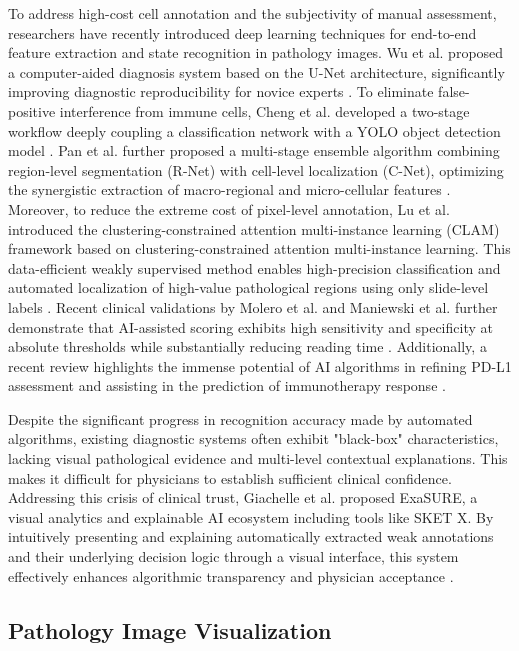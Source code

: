 \documentclass[journal]{vgtc}                     %
\begin{document}
To address high-cost cell annotation and the subjectivity of manual assessment, researchers have recently introduced deep learning techniques for end-to-end feature extraction and state recognition in pathology images. Wu et al. proposed a computer-aided diagnosis system based on the U-Net architecture, significantly improving diagnostic reproducibility for novice experts \cite{wu2022artificial}. To eliminate false-positive interference from immune cells, Cheng et al. developed a two-stage workflow deeply coupling a classification network with a YOLO object detection model \cite{cheng2022artificial}. Pan et al. further proposed a multi-stage ensemble algorithm combining region-level segmentation (R-Net) with cell-level localization (C-Net), optimizing the synergistic extraction of macro-regional and micro-cellular features \cite{pan2021automated}. Moreover, to reduce the extreme cost of pixel-level annotation, Lu et al. introduced the clustering-constrained attention multi-instance learning (CLAM) framework based on clustering-constrained attention multi-instance learning. This data-efficient weakly supervised method enables high-precision classification and automated localization of high-value pathological regions using only slide-level labels \cite{lu2021data}. Recent clinical validations by Molero et al. and Maniewski et al. further demonstrate that AI-assisted scoring exhibits high sensitivity and specificity at absolute thresholds while substantially reducing reading time \cite{molero2025assessment,maniewski2026clinical}. Additionally, a recent review highlights the immense potential of AI algorithms in refining PD-L1 assessment and assisting in the prediction of immunotherapy response \cite{zdrenka2024refining}.

Despite the significant progress in recognition accuracy made by automated algorithms, existing diagnostic systems often exhibit "black-box" characteristics, lacking visual pathological evidence and multi-level contextual explanations. This makes it difficult for physicians to establish sufficient clinical confidence. Addressing this crisis of clinical trust, Giachelle et al. proposed ExaSURE, a visual analytics and explainable AI ecosystem including tools like SKET X. By intuitively presenting and explaining automatically extracted weak annotations and their underlying decision logic through a visual interface, this system effectively enhances algorithmic transparency and physician acceptance \cite{giachelle2023bridging}.

\subsection{Pathology Image Visualization }
\end{document}
